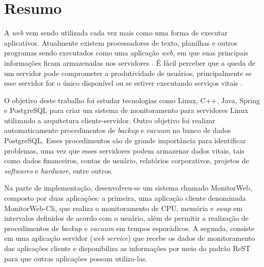 
\chapter*{Resumo}

A \textit{web} vem sendo utilizada cada vez mais como uma forma de executar aplicativos. Atualmente existem processadores de texto, planilhas e outros programas sendo executados como uma aplicação \textit{web}, em que suas principais informações ficam armazenadas nos servidores \cite{Marimoto:2011}. É fácil perceber que a queda de um servidor pode comprometer a produtividade de usuários, principalmente se esse servidor for o único disponível ou se estiver executando serviços vitais \cite{Weber:2002}.

O objetivo deste trabalho foi estudar tecnologias como Linux, C++, Java, Spring e PostgreSQL para criar um sistema de monitoramento para servidores Linux utilizando a arquitetura cliente-servidor. Outro objetivo foi realizar automaticamente procedimentos de \textit{backup} e \textit{vacuum} no banco de dados PostgreSQL. Esses procedimentos são de grande importância para identificar problemas, uma vez que esses servidores podem armazenar dados vitais, tais como dados financeiros, contas de usuário, relatórios corporativos, projetos de \textit{softwares} e \textit{hardware}, entre outros.

Na parte de implementação, desenvolveu-se um sistema chamado MonitorWeb, composto por duas aplicações: a primeira, uma aplicação cliente denominada MonitorWeb-Cli, que realiza o monitoramento de CPU, memória e \textit{swap} em intervalos definidos de acordo com o usuário, além de permitir a realização de procedimentos de \textit{backup} e \textit{vacuum} em tempos esporádicos. A segunda, consiste em uma aplicação servidor (\textit{web service}) que recebe os dados de monitoramento das aplicações cliente e disponibiliza as informações por meio do padrão ReST para que outras aplicações possam utiliza-las.

